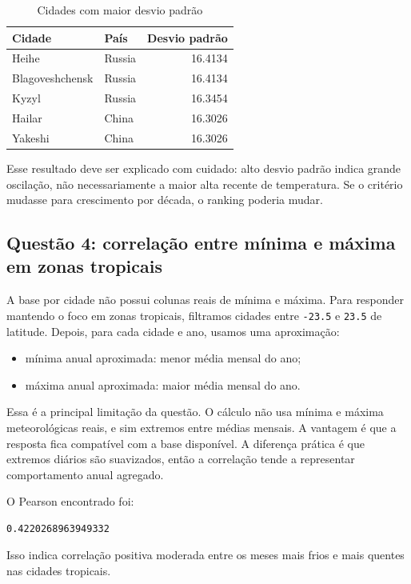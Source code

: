 \documentclass[12pt,a4paper]{article}
\begin{document}
\begin{table}[H]
\centering
\caption{Cidades com maior desvio padrão}
\begin{tabular}{llr}
\toprule
Cidade & País & Desvio padrão \\
\midrule
Heihe & Russia & 16.4134 \\
Blagoveshchensk & Russia & 16.4134 \\
Kyzyl & Russia & 16.3454 \\
Hailar & China & 16.3026 \\
Yakeshi & China & 16.3026 \\
\bottomrule
\end{tabular}
\end{table}

Esse resultado deve ser explicado com cuidado: alto desvio padrão indica grande oscilação, não necessariamente a maior alta recente de temperatura. Se o critério mudasse para crescimento por década, o ranking poderia mudar.

\subsection{Questão 4: correlação entre mínima e máxima em zonas tropicais}

A base por cidade não possui colunas reais de mínima e máxima. Para responder mantendo o foco em zonas tropicais, filtramos cidades entre \texttt{-23.5} e \texttt{23.5} de latitude. Depois, para cada cidade e ano, usamos uma aproximação:

\begin{itemize}
    \item mínima anual aproximada: menor média mensal do ano;
    \item máxima anual aproximada: maior média mensal do ano.
\end{itemize}

Essa é a principal limitação da questão. O cálculo não usa mínima e máxima meteorológicas reais, e sim extremos entre médias mensais. A vantagem é que a resposta fica compatível com a base disponível. A diferença prática é que extremos diários são suavizados, então a correlação tende a representar comportamento anual agregado.

O Pearson encontrado foi:

\begin{lstlisting}
0.4220268963949332
\end{lstlisting}

Isso indica correlação positiva moderada entre os meses mais frios e mais quentes nas cidades tropicais.
\end{document}

